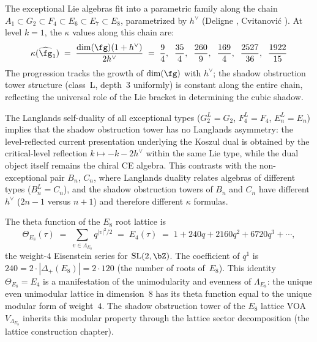 \begin{remark}%
\label{rem:deligne-cvitanovic}
The exceptional Lie algebras fit into a parametric family
along the chain $A_1 \subset G_2 \subset F_4 \subset E_6
\subset E_7 \subset E_8$, parametrized by $h^\vee$
(Deligne \cite{Deligne96}, Cvitanovi\'c \cite{Cvitanovic08}).
At level $k = 1$, the $\kappa$ values along this chain are:
\[
\kappa(\widehat{\fg}_1)
\;=\; \frac{\dim(\fg)(1 + h^\vee)}{2h^\vee}
\;=\; \frac{9}{4},\;\; \frac{35}{4},\;\; \frac{260}{9},\;\; \frac{169}{4},\;\; \frac{2527}{36},\;\; \frac{1922}{15}
\]
The progression tracks the growth of $\dim(\fg)$ with $h^\vee$;
the shadow obstruction tower structure (class~L, depth~$3$ uniformly) is
constant along the entire chain, reflecting the universal role of
the Lie bracket in determining the cubic shadow.

The Langlands self-duality of all exceptional types
($G_2^L = G_2$, $F_4^L = F_4$, $E_n^L = E_n$) implies that
the shadow obstruction tower has no Langlands asymmetry: the
level-reflected current presentation underlying the Koszul dual is
obtained by the critical-level reflection
$k \mapsto -k - 2h^\vee$ within the same Lie type, while the dual
object itself remains the chiral CE algebra. This contrasts with the
non-exceptional pair $B_n$, $C_n$, where Langlands duality
relates algebras of different types ($B_n^L = C_n$), and the
shadow obstruction towers of $B_n$ and $C_n$ have different $h^\vee$
\textup{(}$2n-1$ versus $n+1$\textup{)} and therefore different $\kappa$
formulas.
\end{remark}

\begin{remark}%
\label{rem:e8-theta-function}
The theta function of the $E_8$ root lattice is
\[
\Theta_{E_8}(\tau)
\;=\; \sum_{v \in \Lambda_{E_8}} q^{|v|^2/2}
\;=\; E_4(\tau)
\;=\; 1 + 240q + 2160q^2 + 6720q^3 + \cdots,
\]
the weight-$4$ Eisenstein series for $\mathrm{SL}(2,\bZ)$.
The coefficient of $q^1$ is $240 = 2 \cdot |\Delta_+(E_8)| = 2 \cdot 120$
(the number of roots of~$E_8$). This identity
$\Theta_{E_8} = E_4$ is a manifestation of the unimodularity
and evenness of $\Lambda_{E_8}$: the unique even unimodular
lattice in dimension~$8$ has its theta function equal to the
unique modular form of weight~$4$. The shadow obstruction tower of the
$E_8$ lattice VOA $V_{\Lambda_{E_8}}$ inherits this modular
property through the lattice sector decomposition
(the lattice construction chapter).
\end{remark}



